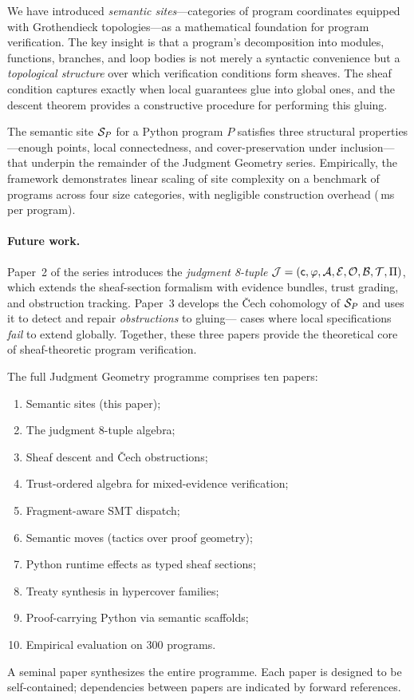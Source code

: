 \documentclass[11pt]{article}
\begin{document}
We have introduced \emph{semantic sites}---categories of program coordinates
equipped with Grothendieck topologies---as a mathematical foundation for
program verification.  The key insight is that a program's decomposition into
modules, functions, branches, and loop bodies is not merely a syntactic
convenience but a \emph{topological structure} over which verification
conditions form sheaves.  The sheaf condition captures exactly when local
guarantees glue into global ones, and the descent theorem provides a
constructive procedure for performing this gluing.

The semantic site $\mathcal{S}_P$ for a Python program $P$ satisfies three
structural properties---enough points, local connectedness, and
cover-preservation under inclusion---that underpin the remainder of the
Judgment Geometry series.  Empirically, the framework demonstrates linear
scaling of site complexity on a benchmark of \compTotalPrograms{} programs
across four size categories, with negligible construction overhead
(\compSiteMeanBuildMs\,ms per program).

\paragraph{Future work.}
Paper~2 of the series introduces the \emph{judgment 8-tuple}
$\mathcal{J} = (\mathsf{c}, \varphi, \mathcal{A}, \mathcal{E}, \mathcal{O}, \mathcal{B}, \mathcal{T}, \Pi)$,
which extends the sheaf-section formalism with evidence bundles, trust
grading, and obstruction tracking.  Paper~3 develops the Čech cohomology of
$\mathcal{S}_P$ and uses it to detect and repair \emph{obstructions} to gluing---
cases where local specifications \emph{fail} to extend globally.  Together,
these three papers provide the theoretical core of sheaf-theoretic program
verification.

The full Judgment Geometry programme comprises ten papers:
\begin{enumerate}[nosep]
  \item Semantic sites (this paper);
  \item The judgment 8-tuple algebra;
  \item Sheaf descent and Čech obstructions;
  \item Trust-ordered algebra for mixed-evidence verification;
  \item Fragment-aware SMT dispatch;
  \item Semantic moves (tactics over proof geometry);
  \item Python runtime effects as typed sheaf sections;
  \item Treaty synthesis in hypercover families;
  \item Proof-carrying Python via semantic scaffolds;
  \item Empirical evaluation on 300 programs.
\end{enumerate}
A seminal paper synthesizes the entire programme.  Each paper is designed to
be self-contained; dependencies between papers are indicated by forward
references.
\end{document}
